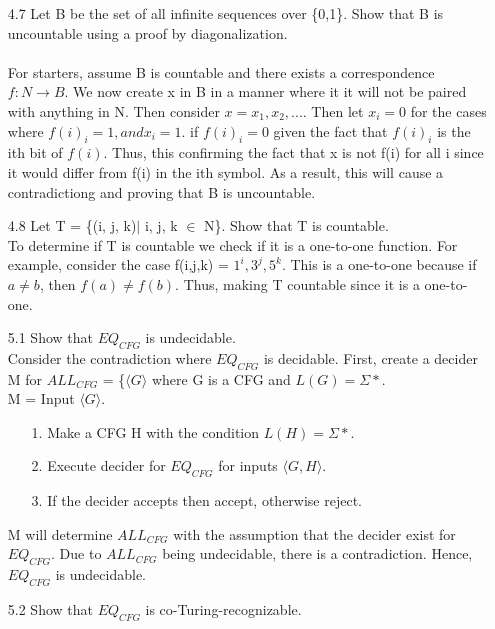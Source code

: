 \documentclass{scrartcl}
\begin{document}
\begin{enumerate}
\begin{enumerate}
		\end{enumerate}
	\item[4.7] Let B be the set of all infinite sequences over \{0,1\}. Show that B is uncountable using a proof by diagonalization.\\ \\ 
						For starters, assume B is countable and there exists a correspondence $f: N\rightarrow B$. We now create x in B in a manner where it it will not be paired with anything in N. Then consider $x = x_1 , x_2 , ...$. Then let $x_i = 0$ for the cases where $f(i)_i = 1, and x_i = 1.$ if $f(i)_i = 0$ given the fact that $f(i)_i$ is the ith bit of $f(i)$. Thus, this confirming the fact that x is not f(i) for all i since it would differ from f(i) in the ith symbol. As a result, this will cause a contradictiong and proving that B is uncountable. 
	\item[4.8] Let T = \{(i, j, k)$|$ i, j, k $\in$ N\}. Show that T is countable.\\ 
	To determine if T is countable we check if it is a one-to-one function. For example, consider the case f(i,j,k) = $1^i, 3^j, 5^k$. This is a one-to-one because if $a\neq b$, then $f(a)\neq f(b)$. Thus, making T countable since it is a one-to-one. 
	
	\item[5.1] Show that $EQ_{CFG}$ is undecidable.\\
						 Consider the contradiction where $EQ_{CFG}$ is decidable. First, create a decider M for $ALL_{CFG}$ = \{$\langle G\rangle$ where G is a CFG and $L(G) = \Sigma *$. \\ 
						M = Input $\langle G\rangle$.\\ 
						\begin{enumerate}
							\item[1.] Make a CFG H with the condition $L(H) = \Sigma *$.
							\item[2.] Execute decider for $EQ_{CFG}$ for inputs $\langle G,H\rangle$.
							\item[3.] If the decider accepts then accept, otherwise reject.
							
						\end{enumerate}
						M will determine $ALL_{CFG}$ with the assumption that the decider exist for $EQ_{CFG}$. Due to $ALL_{CFG}$ being undecidable, there is a contradiction. Hence, $EQ_{CFG}$ is undecidable. 
	\item[5.2] Show that $EQ_{CFG}$ is co-Turing-recognizable.\\
						

\end{enumerate}
\end{document}
